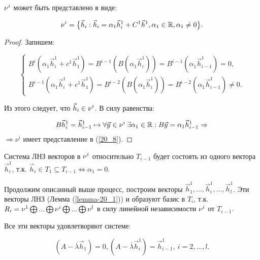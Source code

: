 \begin{proposition}
	$\nu^i$ может быть представлено в виде: 
	
	\begin{equation}\label{20_8}
		\nu^i = \big\lbrace \vec{h}_i: \vec{h}_i = \alpha_1 \vec{h}_i^1 + C^1 \vec{h}^1, \alpha_1 \in \mathbb{R} , \alpha_1 \neq 0 \big\rbrace.
	\end{equation}
	
	\begin{proof}
		
		Запишем:
		
		\begin{equation*}
			\begin{cases}
				B^i ( \alpha_1\vec{h}_i^1 + c^1 \vec{h}_1^1) = B^{i - 1} (B(\alpha_1 \vec{h}_i^1 )) = B^{i - 1} (\alpha_1 \vec{h}_{i-1}^1) = 0, \\
				B^{i-1} ( \alpha_1\vec{h}_i^1 + c^1 \vec{h}_1^1) = B^{i - 2} (B(\alpha_1 \vec{h}_i^1 )) = B^{i - 2} (\alpha_1 \vec{h}_{i-1}^1) \neq 0.
			\end{cases}
		\end{equation*}
		
		Из этого следует, что $\vec{h}_i \in \nu^i$. В силу равенства:
		
		\[B\vec{h}_i^1 = \vec{h}_{i-1}^1 \mapsto \forall \vec{y} \in \nu^i \: \exists \alpha_1 \in \mathbb{R} : B\vec{y} = \alpha_1\vec{h}_{i-1}^1 \Rightarrow\]
$\Rightarrow \nu^i$	имеет представление в (\ref{20_8}).
	\end{proof}
\end{proposition}

Система ЛНЗ векторов в $\nu^i$ относительно $T_{i-1}$ будет состоять из одного вектора $\vec{h}_i^1$, т.к. $\vec{h}_i \in T_1 \subseteq T_{i - 1} \Leftrightarrow \alpha_1 = 0$.

Продолжим описанный выше процесс, построим векторы $\vec{h}_1^1, ... , \vec{h}_i^1 , ... , \vec{h}_l^1$. Эти векторы ЛНЗ (Лемма (\ref{lemma-20_1})) и образуют базис в $T_i$, т.к. $R_i = \nu^1 \bigoplus ... \bigoplus \nu^i \bigoplus ... \bigoplus \nu^l$ в силу линейной независимости $\nu^i$ от $T_{i - 1}$.

Все эти векторы удовлетворяют системе:

\begin{equation}\label{20_9}
	(A - \overline{\lambda} \vec{h}_1) = 0, (A - \overline{\lambda} \vec{h}_i^1) = \vec{h}_{i-1}^1, \: i = 2,..., l. 
\end{equation}

